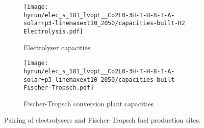 
\begin{figure}
    \centering
    \begin{subfigure}{0.66\textwidth}
        \centering
        \caption{Electrolyser capacities}
        \texttt{[image: \\hyrun/elec\_s\_181\_lvopt\_\_Co2L0-3H-T-H-B-I-A-solar+p3-linemaxext10\_2050/capacities-built-H2 Electrolysis.pdf]}
    \end{subfigure}
    \begin{subfigure}{0.66\textwidth}
        \centering
        \caption{Fischer-Tropsch conversion plant capacities}
        \texttt{[image: \\hyrun/elec\_s\_181\_lvopt\_\_Co2L0-3H-T-H-B-I-A-solar+p3-linemaxext10\_2050/capacities-built-Fischer-Tropsch.pdf]}
    \end{subfigure}
    \caption{Pairing of electrolysers and Fischer-Tropsch fuel production sites. }
    \label{fig:si:colocation}
\end{figure}

